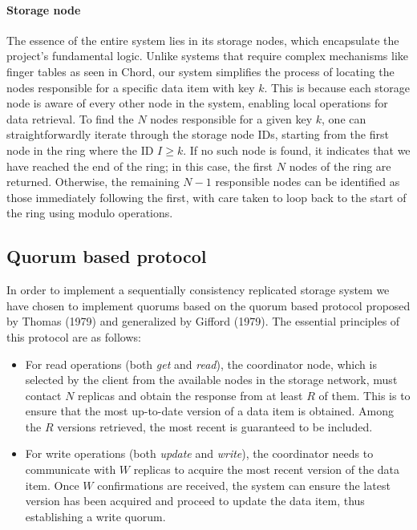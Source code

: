 \documentclass[a4paper, 11pt]{article}
\begin{document}
\paragraph{Storage node} The essence of the entire system lies in its storage nodes, which encapsulate the project's fundamental logic. Unlike systems that require complex mechanisms like finger tables as seen in Chord, our system simplifies the process of locating the nodes responsible for a specific data item with key $k$. This is because each storage node is aware of every other node in the system, enabling local operations for data retrieval. To find the $N$ nodes responsible for a given key $k$, one can straightforwardly iterate through the storage node IDs, starting from the first node in the ring where the ID $I \geq k$. If no such node is found, it indicates that we have reached the end of the ring; in this case, the first $N$ nodes of the ring are returned. Otherwise, the remaining $N-1$ responsible nodes can be identified as those immediately following the first, with care taken to loop back to the start of the ring using modulo operations.

\subsection{Quorum based protocol}

In order to implement a sequentially consistency replicated storage system we have chosen to implement quorums based on the quorum based protocol proposed by Thomas (1979) and generalized by Gifford (1979). The essential principles of this protocol are as follows:
\begin{itemize}
    \item For read operations (both \textit{get} and \textit{read}), the coordinator node, which is selected by the client from the available nodes in the storage network, must contact $N$ replicas and obtain the response from at least $ R $ of them. This is to ensure that the most up-to-date version of a data item is obtained. Among the $ R $ versions retrieved, the most recent is guaranteed to be included.
    \item For write operations (both \textit{update} and \textit{write}), the coordinator needs to communicate with $ W $ replicas to acquire the most recent version of the data item. Once $ W $ confirmations are received, the system can ensure the latest version has been acquired and proceed to update the data item, thus establishing a write quorum.
\end{itemize}
\end{document}
